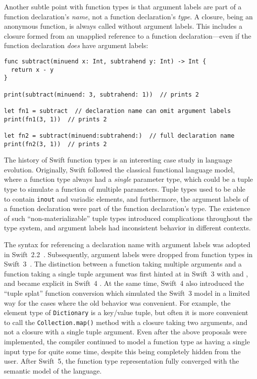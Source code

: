 \documentclass[../generics]{subfiles}
\begin{document}
Another subtle point with function types is that argument labels are part of a function declaration's \emph{name}, not a function declaration's \emph{type}. A closure, being an anonymous function, is always called without argument labels. This includes a closure formed from an unapplied reference to a function declaration---even if the function declaration \emph{does} have argument labels:
\begin{Verbatim}
func subtract(minuend x: Int, subtrahend y: Int) -> Int {
  return x - y
}

print(subtract(minuend: 3, subtrahend: 1))  // prints 2

let fn1 = subtract  // declaration name can omit argument labels
print(fn1(3, 1))  // prints 2

let fn2 = subtract(minuend:subtrahend:)  // full declaration name
print(fn2(3, 1))  // prints 2
\end{Verbatim}

The history of Swift function types is an interesting case study in language evolution. Originally, Swift followed the classical functional language model, where a function type always had a \emph{single} parameter type, which could be a tuple type to simulate a function of multiple parameters. Tuple types used to be able to contain \texttt{inout} and variadic elements, and furthermore, the argument labels of a function declaration were part of the function declaration's type. The existence of such ``non-materializable'' tuple types introduced complications throughout the type system, and argument labels had inconsistent behavior in different contexts.

The syntax for referencing a declaration name with argument labels was adopted in Swift~2.2~\cite{se0021}. Subsequently, argument labels were dropped from function types in Swift~3~\cite{se0111}. The distinction between a function taking multiple arguments and a function taking a single tuple argument was first hinted at in Swift~3 with \cite{se0029} and \cite{se0066}, and became explicit in Swift~4 \cite{se0110}. At the same time, Swift~4 also introduced the ``tuple splat'' function conversion which simulated the Swift~3 model in a limited way for the cases where the old behavior was convenient. For example, the element type of \texttt{Dictionary} is a key/value tuple, but often it is more convenient to call the \texttt{Collection.map()} method with a closure taking two arguments, and not a closure with a single tuple argument. Even after the above proposals were implemented, the compiler continued to model a function type as having a single input type for quite some time, despite this being completely hidden from the user. After Swift~5, the function type representation fully converged with the semantic model of the language.
\end{document}
